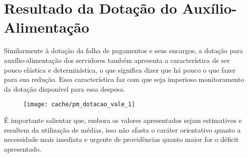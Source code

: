 
\section[Dotação do Auxílio-Alimentação]{Resultado da Dotação do Auxílio-Alimentação}

Similarmente à dotação da folha de pagamentos e seus encargos, a dotação para auxílio-alimentação dos servidores também apresenta a característica de ser pouco elástica e determinística, o que significa dizer que há pouco o que fazer para sua redução. Essa característica faz com que seja imperioso monitoramento da dotação disponível para essa despesa.




\begin{figure}[H]
\center
\texttt{[image: cache/pm\_dotacao\_vale\_1]}
\end{figure}

É importante salientar que, embora os valores apresentados sejam estimativos e resultem da utilização de médias, isso não afasta o caráter orientativo quanto a necessidade mais imediata e urgente de providências quanto maior for o déficit apresentado.